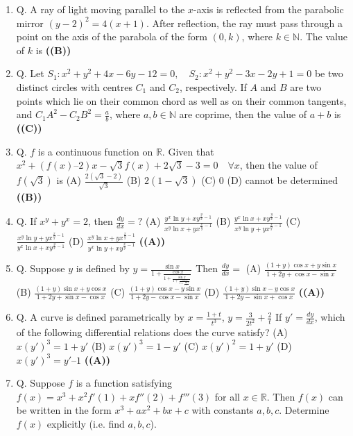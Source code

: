 \documentclass{article}
\begin{document}
\begin{enumerate}
\item Q. A ray of light moving parallel to the $x$-axis is reflected from the parabolic mirror
$(y-2)^2 = 4(x+1)$.
After reflection, the ray must pass through a point on the axis of the parabola of the form
$(0, k)$, where $k \in \mathbb{N}$. The value of $k$ is \hfill \textbf{((B))}
\item Q. Let
$S_1: x^2+y^2+4x-6y-12=0, \quad S_2: x^2+y^2-3x-2y+1=0$
be two distinct circles with centres $C_1$ and $C_2$, respectively. If $A$ and $B$ are two points which
lie on their common chord as well as on their common tangents, and
$C_1A^2-C_2B^2=\frac{a}{b}$,
where $a, b \in \mathbb{N}$ are coprime, then the value of $a+b$ is \hfill \textbf{((C))}
\item Q. $f$ is a continuous function on $\mathbb{R}$. Given that
$x^2 + (f(x) – 2) x - \sqrt{3} f(x) + 2\sqrt{3}-3 = 0 \quad \forall x$,
then the value of $f(\sqrt{3})$ is
(A) $\frac{2(\sqrt{3}-2)}{\sqrt{3}}$
(B) $2(1 - \sqrt{3})$
(C) $0$
(D) cannot be determined \hfill \textbf{((B))}
\item Q. If
$x^y + y^x = 2$,
then $\frac{dy}{dx} =?$
(A) $\frac{y^x \ln y + x y^{\frac{y}{x}-1}}{x^y \ln x + y x^{\frac{x}{y}-1}}$
(B) $\frac{y^x \ln x + x y^{\frac{y}{x}-1}}{x^y \ln y + y x^{\frac{x}{y}-1}}$
(C) $\frac{x^y \ln y + y x^{\frac{x}{y}-1}}{y^x \ln x + x y^{\frac{y}{x}-1}}$
(D) $\frac{x^y \ln x + y x^{\frac{x}{y}-1}}{y^x \ln y + x y^{\frac{x}{y}-1}}$ \hfill \textbf{((A))}
\item Q. Suppose $y$ is defined by
$y = \frac{\sin x}{1+\frac{\cos x}{1+\frac{\sin x}{1+\frac{\cos x}{1+\frac{\sin x}{1+\ldots}}}}}$
Then $\frac{dy}{dx} =$
(A) $\frac{(1+y) \cos x + y \sin x}{1 + 2y + \cos x - \sin x}$
(B) $\frac{(1 + y) \sin x + y \cos x}{1 + 2y + \sin x - \cos x}$
(C) $\frac{(1 + y) \cos x - y \sin x}{1+2y - \cos x - \sin x}$
(D) $\frac{(1 + y) \sin x - y \cos x}{1+2y- \sin x + \cos x}$ \hfill \textbf{((A))}
\item Q. A curve is defined parametrically by
$x = \frac{1+t}{t^3}$, $y=\frac{3}{2t^2} + \frac{2}{t}$
If $y' = \frac{dy}{dx}$, which of the following differential relations does the curve satisfy?
(A) $x (y')^3 = 1 + y'$
(B) $x (y')^3 = 1 - y'$
(C) $x (y')^2 = 1 + y'$
(D) $x (y')^3 = y' – 1$ \hfill \textbf{((A))}
\item Q. Suppose $f$ is a function satisfying
$f(x) = x^3 + x^2 f'(1) + x f''(2) + f'''(3)$ for all $x \in \mathbb{R}$.
Then $f(x)$ can be written in the form $x^3 + ax^2 + bx + c$ with constants $a, b, c$. Determine
$f(x)$ explicitly (i.e. find $a, b, c$).

\end{enumerate}
\end{document}
